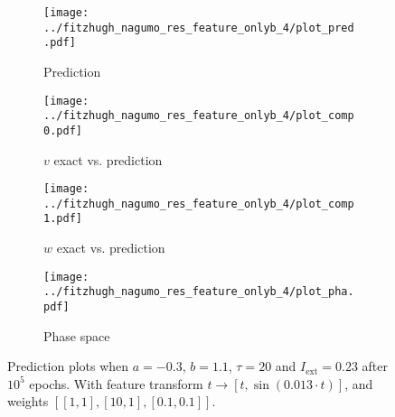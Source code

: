 \documentclass[a4paper]{article}
\begin{document}
\begin{figure}[H]
	\centering 
	\begin{subfigure}[b]{0.47\textwidth}
		\centering
		\texttt{[image: ../fitzhugh\_nagumo\_res\_feature\_onlyb\_4/plot\_pred.pdf]}
		\caption{Prediction}
		\label{fig:justb05a}
	\end{subfigure}
	\begin{subfigure}[b]{0.47\textwidth}
		\centering
		\texttt{[image: ../fitzhugh\_nagumo\_res\_feature\_onlyb\_4/plot\_comp0.pdf]}
		\caption{$v$ exact vs. prediction}
		\label{fig:justb05b}
	\end{subfigure}
	\begin{subfigure}[b]{0.47\textwidth}
		\centering
		\texttt{[image: ../fitzhugh\_nagumo\_res\_feature\_onlyb\_4/plot\_comp1.pdf]}
		\caption{$w$ exact vs. prediction}
		\label{fig:justb05c}
	\end{subfigure}
	\begin{subfigure}[b]{0.47\textwidth}
		\centering
		\texttt{[image: ../fitzhugh\_nagumo\_res\_feature\_onlyb\_4/plot\_pha.pdf]}
		\caption{Phase space}
		\label{fig:justb05d}
	\end{subfigure}
	\caption{Prediction plots when $a=-0.3$, $b=1.1$, $\tau=20$ and $ I_{\text{ext}}=0.23$ after $10^5$ epochs. With feature transform $t \rightarrow \left[ t, \sin(0.013\cdot t) \right] $, and weights $\left[ \left[ 1, 1\right], \left[ 10, 1\right], \left[ 0.1, 0.1 \right]\right]$.}
	\label{plot:justb05}
\end{figure} 	
\end{document}
